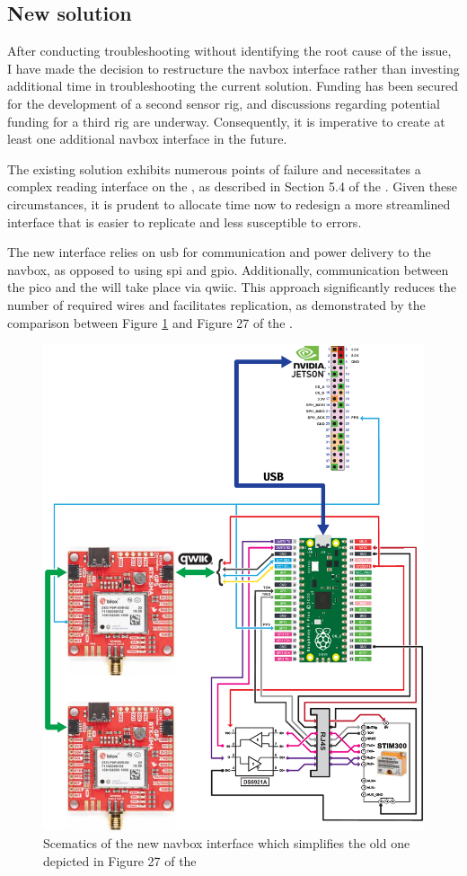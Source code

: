 \subsection{New solution}
After conducting troubleshooting without identifying the root cause of the issue, I have made the decision to restructure the \gls{navbox} interface rather than investing additional time in troubleshooting the current solution.
Funding has been secured for the development of a second sensor rig, and discussions regarding potential funding for a third rig are underway.
Consequently, it is imperative to create at least one additional \gls{navbox} interface in the future.

The existing solution exhibits numerous points of failure and necessitates a complex reading interface on the \jx, as described in Section 5.4 of the \preproject.
Given these circumstances, it is prudent to allocate time now to redesign a more streamlined interface that is easier to replicate and less susceptible to errors.

The new interface relies on \gls{usb} for communication and power delivery to the \gls{navbox}, as opposed to using \gls{spi} and \gls{gpio}.
Additionally, communication between the \gls{pico} and the  will take place via \gls{qwiic}.
This approach significantly reduces the number of required wires and facilitates replication, as demonstrated by the comparison between Figure \ref{fig:navbox_usb} and Figure 27 of the \preproject.

\begin{figure}
    \centering
    \includegraphics[width=.9\textwidth]{figures/navbox/navbox_usb.pdf}
    \caption{Scematics of the new \gls{navbox} interface which simplifies the old one depicted in Figure 27 of the \preproject}
    \label{fig:navbox_usb}
\end{figure}


